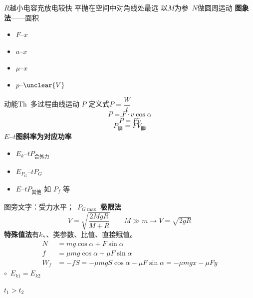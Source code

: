 $R$越小\quad 电容充放电较快
平抛在空间中对角线处最远
以$M$为参\ $N$做圆周运动 %
\textbf{图象法}——面积
\begin{itemize}
\item $F$--$x$
\item $a$--$x$
\item $\mu$--$x$
\item $p$--$\unclear{V}$
\end{itemize}
动能Th\ 多过程曲线运动
$P$ 定义式\quad $P=\dfrac{W}{t}$
\[
P=F\cdot v\cos\alpha
\]
\[
\bar P=F\bar v
\]
\[
P_{\text{瞬}}=FV_{\text{瞬}}
\]
\textbf{$E$--$t$图斜率为对应功率}
\begin{itemize}
\item $E_k$--$t$\quad $P_{\text{合外力}}$
\item $E_{P_G}$--$t$\quad $P_G$
\item $E$--$t$\quad $P_{\text{其他}}$ 如 $P_f$ 等
\end{itemize}
图旁文字：受力水平；\ $P_{G\max}$
\textbf{极限法}
\[
V=\sqrt{\frac{2MgR}{M+R}}\qquad M\gg m\to V=\sqrt{2gR}
\] %
\textbf{特殊值法}\quad 有$k$、、类参数、比值、直接赋值。
\begin{align*}
N&=mg\cos\alpha+F\sin\alpha\\
f&=\mu mg\cos\alpha+\mu F\sin\alpha\\
W_f&=-fS=-\mu mgS\cos\alpha-\mu F\sin\alpha=-\mu mgx-\mu Fy %
\end{align*}
$\circ$\ $E_{k1}=E_{k2}$ %

\quad $t_1>t_2$

